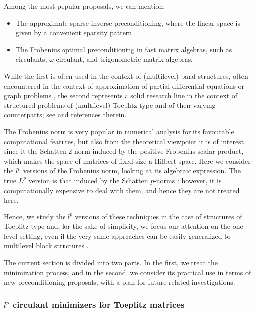 \documentclass{article}
\begin{document}
Among the most popular proposals, we can mention:
\begin{itemize}
\item The approximate sparse inverse preconditioning, where the linear space is given by a convenient sparsity pattern.
\item The Frobenius optimal preconditioning in fast matrix algebras, such as circulants, $\omega$-circulant, and trigonometric matrix algebras.
\end{itemize}
While the first is often used in the context of (multilevel) band structures, often encountered in the context of approximation of partial differential equations or graph problems \cite{sparse_appr1,sparse_appr2}, the second represents a solid research line in the context of structured problems of (multilevel) Toeplitz type and of their varying counterparts; see \cite{GLT-bookI,Ng_book} and references therein.

The Frobenius norm is very popular in numerical analysis for its favourable computational features, but also from the theoretical viewpoint it is of interest since it the Schatten $2$-norm induced by the positive Frobenius scalar product, which makes the space of matrices of fixed size a Hilbert space. Here we consider the $l^p$ versions of the Frobenius norm, looking at its algebraic expression. The true $L^p$ version is that induced by the Schatten $p$-norms \cite{Bhatia}: however, it is computationally expensive to deal with them, and hence they are not treated here.



Hence, we study the $l^p$ versions of these techniques in the case of structures of Toeplitz type and, for the sake of simplicity, we focus our attention on the one-level setting, even if the very same approaches can be easily generalized to multilevel block structures \cite{GLT-bookIV}.

The current section is divided into two parts. In the first, we treat the minimization process, and in the second, we consider its practical use in terms of new preconditioning proposals, with a plan for future related investigations.



\subsubsection{$ l^{ p } $ circulant minimizers for Toeplitz matrices}
\end{document}
